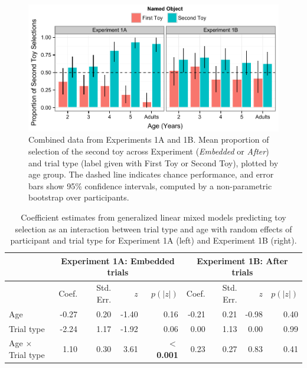 \documentclass[man]{apa2}
\begin{document}
\begin{figure}
  \begin{center} 
    \includegraphics[width=6in]{figures/continuity_kids_and_adults_barplot_mod.pdf} 
    \caption{\label{fig:res5} Combined data from Experiments 1A and 1B.  Mean proportion of selection of the second toy across Experiment (\emph{Embedded} or \emph{After}) and trial type (label given with First Toy or Second Toy), plotted by age group. The dashed line indicates chance performance, and error bars show 95\% confidence intervals, computed by a non-parametric bootstrap over participants.} 
  \end{center} 
\end{figure}	



  \begin{table} [t]
   \caption{Coefficient estimates from generalized linear mixed models predicting toy selection as an interaction between trial type and age with random effects of participant and trial type for Experiment 1A (left) and Experiment 1B (right).
   \label{tab:coefficient_estimates} } 
   \begin{center} 
     \begin{tabular}{lrrrr|rrrr} 
          & \multicolumn{4}{c}{Experiment 1A: Embedded trials} &  \multicolumn{4}{c}{Experiment 1B: After trials}\\
                      \hline 
       \null  & Coef. & Std. Err. & $z$  &  $p(|z|)$ & Coef. & Std. Err. & $z$  &  $p(|z|)$  \\ 
       \hline  
        Age   & -0.27 	&  0.20 & -1.40 & 0.16						               & -0.21 & 0.21 & -0.98 & 0.40\\ 
        Trial type   & -2.24 & 1.17 &  -1.92 & 0.06				                       & 0.00 & 1.13 & 0.00 & 0.99 \\
        Age $\times$ Trial type    & 1.10 & 0.30 & 3.61 &\textbf{ $<$0.001} 		& 0.23 & 0.27 & 0.83 & 0.41\\ 
       \hline 
     \end{tabular} 
  \end{center}
 \end{table}
 
\end{document}
